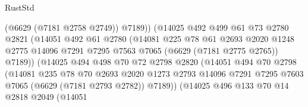 \begin{lexlean}{RustStd}
\begin{coremodule}
                                  (@6629 (@7181 @2758 @2749))
                                  @7189))
                              (@14025
                                @492
                                @499
                                @61
                                @73
                                @2780
                                @2821
                                (@14051
                                  @492
                                  @61
                                  @2780
                                  (@14081
                                    @225
                                    @78
                                    @61
                                    @2693
                                    @2020
                                    @1248
                                    @2775
                                    @14096
                                    @7291
                                    @7295
                                    @7563
                                    @7065
                                    (@6629 (@7181 @2775 @2765))
                                    @7189))
                                (@14025
                                  @494
                                  @498
                                  @70
                                  @72
                                  @2798
                                  @2820
                                  (@14051
                                    @494
                                    @70
                                    @2798
                                    (@14081
                                      @235
                                      @78
                                      @70
                                      @2693
                                      @2020
                                      @1273
                                      @2793
                                      @14096
                                      @7291
                                      @7295
                                      @7603
                                      @7065
                                      (@6629 (@7181 @2793 @2782))
                                      @7189))
                                  (@14025
                                    @496
                                    @133
                                    @70
                                    @14
                                    @2818
                                    @2049
                                    (@14051

\end{coremodule}
\end{lexlean}
